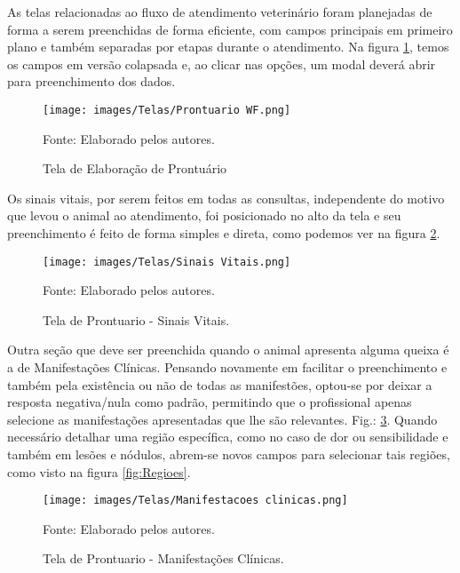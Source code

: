\documentclass[
    12pt,               %
    openright,          %
    oneside,
    a4paper,            %
    BIBLATEX,           %
    TODO,               %
    english,            %
    brazil              %
    ]{ifsp-spo-inf-ctds}
\begin{document}
As telas relacionadas ao fluxo de atendimento veterinário foram planejadas de forma a serem preenchidas de forma eficiente, com campos principais em primeiro plano e também separadas por etapas durante o atendimento. Na figura \ref{fig:ProntuarioWF}, temos os campos em versão colapsada e, ao clicar nas opções, um modal deverá abrir para preenchimento dos dados. 

\begin{figure}[H]
                \centering
                \caption{Tela de Elaboração de Prontuário}
                \texttt{[image: images/Telas/Prontuario WF.png]}

                \label{fig:ProntuarioWF}
                \centering
        {\footnotesize Fonte: Elaborado pelos autores.}
            \end{figure}    

Os sinais vitais, por serem feitos em todas as consultas, independente do motivo que levou o animal ao atendimento, foi posicionado no alto da tela e seu preenchimento é feito de forma simples e direta, como podemos ver na figura \ref{fig:SinaisVitais}.

\begin{figure}[H]
                \centering
                \caption{Tela de Prontuario - Sinais Vitais.}
                \texttt{[image: images/Telas/Sinais Vitais.png]}

                \label{fig:SinaisVitais}
                \centering
        {\footnotesize Fonte: Elaborado pelos autores.}
            \end{figure}    

Outra seção que deve ser preenchida quando o animal apresenta alguma queixa é a de Manifestações Clínicas. Pensando novamente em facilitar o preenchimento e também pela existência ou não de todas as manifestões, optou-se por deixar a resposta negativa/nula como padrão, permitindo que o profissional apenas selecione as manifestações apresentadas que lhe são relevantes. Fig.: \ref{fig:Manifestacoes}. Quando necessário detalhar uma região específica, como no caso de dor ou sensibilidade e também em lesões e nódulos, abrem-se novos campos para selecionar tais regiões, como visto na figura \ref{fig:Regioes}. 

   \begin{figure}[H]
                \centering
                \caption{Tela de Prontuario - Manifestações Clínicas.}
                \texttt{[image: images/Telas/Manifestacoes clinicas.png]}

                \label{fig:Manifestacoes}
                \centering
        {\footnotesize Fonte: Elaborado pelos autores.}
            \end{figure}    
\end{document}
